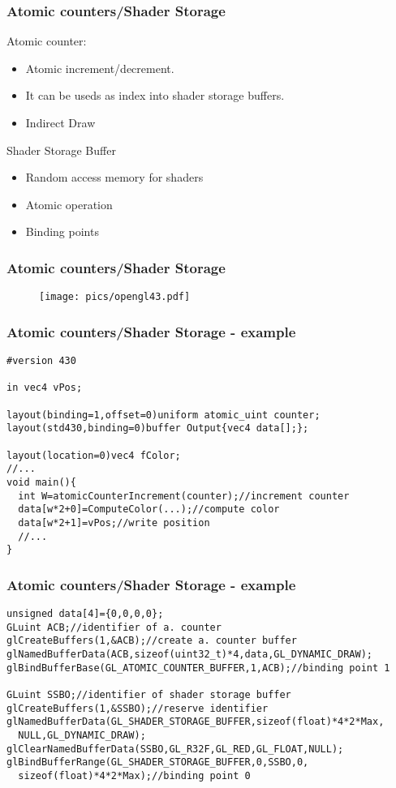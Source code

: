 
\begin{frame}
\frametitle{Atomic counters/Shader Storage}
	Atomic counter:
	\begin{itemize}
	\item Atomic increment/decrement.
	\item It can be useds as index into shader storage buffers.
	\item Indirect Draw
	\end{itemize}
	Shader Storage Buffer
	\begin{itemize}
	\item Random access memory for shaders
	\item Atomic operation
	\item Binding points
	\end{itemize}
\end{frame}

\begin{frame}
\frametitle{Atomic counters/Shader Storage}
	\begin{figure}[h]
	\texttt{[image: pics/opengl43.pdf]}
	\end{figure}
\end{frame}

\begin{frame}[fragile]
\frametitle{Atomic counters/Shader Storage - example}
{\scriptsize
\begin{verbatim}
#version 430

in vec4 vPos;

layout(binding=1,offset=0)uniform atomic_uint counter;
layout(std430,binding=0)buffer Output{vec4 data[];};

layout(location=0)vec4 fColor;
//...
void main(){
  int W=atomicCounterIncrement(counter);//increment counter
  data[w*2+0]=ComputeColor(...);//compute color
  data[w*2+1]=vPos;//write position
  //...
}
\end{verbatim}
}
\end{frame}

\begin{frame}[fragile]
\frametitle{Atomic counters/Shader Storage - example}
{\scriptsize
\begin{verbatim}
unsigned data[4]={0,0,0,0};
GLuint ACB;//identifier of a. counter
glCreateBuffers(1,&ACB);//create a. counter buffer
glNamedBufferData(ACB,sizeof(uint32_t)*4,data,GL_DYNAMIC_DRAW);
glBindBufferBase(GL_ATOMIC_COUNTER_BUFFER,1,ACB);//binding point 1

GLuint SSBO;//identifier of shader storage buffer
glCreateBuffers(1,&SSBO);//reserve identifier
glNamedBufferData(GL_SHADER_STORAGE_BUFFER,sizeof(float)*4*2*Max,
  NULL,GL_DYNAMIC_DRAW);
glClearNamedBufferData(SSBO,GL_R32F,GL_RED,GL_FLOAT,NULL);
glBindBufferRange(GL_SHADER_STORAGE_BUFFER,0,SSBO,0,
  sizeof(float)*4*2*Max);//binding point 0
\end{verbatim}
}
\end{frame}

